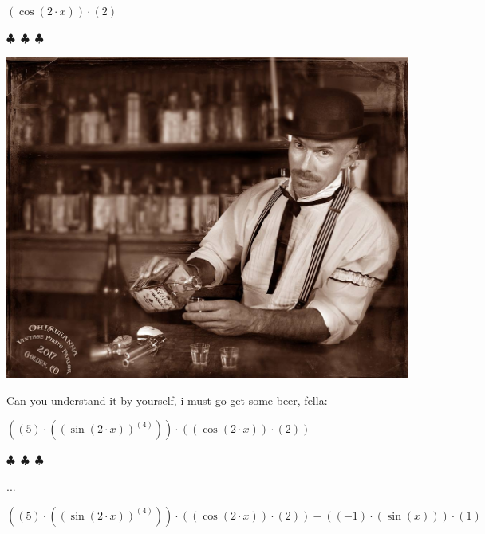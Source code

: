 \documentclass{article}
\begin{document}
\begin{center}$
{{({\cos{({{2}\cdot{x}})}})}\cdot{({2})}}
$\end{center}
\begin{center} $\clubsuit$~$\clubsuit$~$\clubsuit$ \end{center}\begin{center}  \includegraphics[scale=0.3]{funny_pics/bartender.jpg} \end{center}Can you understand it by yourself, i must go get some beer, fella:
\begin{center}$
{{({{({5})}\cdot{({{({\sin{({{2}\cdot{x}})}})}^{({4})}})}})}\cdot{({{({\cos{({{2}\cdot{x}})}})}\cdot{({2})}})}}
$\end{center}
\begin{center} $\clubsuit$~$\clubsuit$~$\clubsuit$ \end{center}...
\begin{center}$
{{{({{({5})}\cdot{({{({\sin{({{2}\cdot{x}})}})}^{({4})}})}})}\cdot{({{({\cos{({{2}\cdot{x}})}})}\cdot{({2})}})}}-{{({{({-1})}\cdot{({\sin{({x})}})}})}\cdot{({1})}}}
$\end{center}
\end{document}
